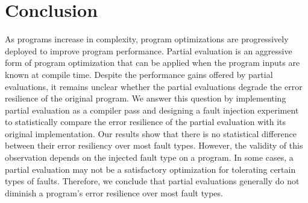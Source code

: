 \section{Conclusion}
\label{sec:conclusion}

As programs increase in complexity, program optimizations are progressively deployed to improve program performance.
Partial evaluation is an aggressive form of program optimization that can be applied when the program inputs are known at compile time.
Despite the performance gains offered by partial evaluations, it remains unclear whether the partial evaluations degrade the error resilience of the original program.
We answer this question by implementing partial evaluation as a compiler pass and designing a fault injection experiment to statistically compare the error resilience of the partial evaluation with its original implementation.
Our results show that there is no statistical difference between their error resiliency over most fault types.
However, the validity of this observation depends on the injected fault type on a program.
In some cases, a partial evaluation may not be a satisfactory optimization for tolerating certain types of faults.
Therefore, we conclude that partial evaluations generally do not diminish a program's error resilience over most fault types. 
